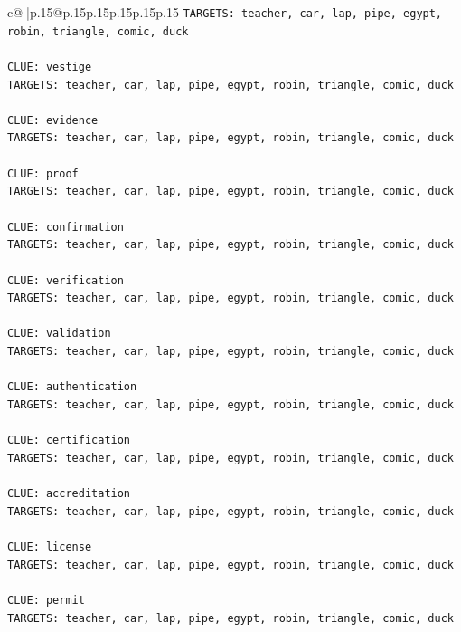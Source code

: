 \documentclass{article}
\begin{document}
{\begin{supertabular}{c@{$\;$}|p{.15\linewidth}@{}p{.15\linewidth}p{.15\linewidth}p{.15\linewidth}p{.15\linewidth}p{.15\linewidth}}
{{{\texttt{TARGETS: teacher, car, lap, pipe, egypt, robin, triangle, comic, duck} \\
\\ 
\texttt{CLUE: vestige} \\
\texttt{TARGETS: teacher, car, lap, pipe, egypt, robin, triangle, comic, duck} \\
\\ 
\texttt{CLUE: evidence} \\
\texttt{TARGETS: teacher, car, lap, pipe, egypt, robin, triangle, comic, duck} \\
\\ 
\texttt{CLUE: proof} \\
\texttt{TARGETS: teacher, car, lap, pipe, egypt, robin, triangle, comic, duck} \\
\\ 
\texttt{CLUE: confirmation} \\
\texttt{TARGETS: teacher, car, lap, pipe, egypt, robin, triangle, comic, duck} \\
\\ 
\texttt{CLUE: verification} \\
\texttt{TARGETS: teacher, car, lap, pipe, egypt, robin, triangle, comic, duck} \\
\\ 
\texttt{CLUE: validation} \\
\texttt{TARGETS: teacher, car, lap, pipe, egypt, robin, triangle, comic, duck} \\
\\ 
\texttt{CLUE: authentication} \\
\texttt{TARGETS: teacher, car, lap, pipe, egypt, robin, triangle, comic, duck} \\
\\ 
\texttt{CLUE: certification} \\
\texttt{TARGETS: teacher, car, lap, pipe, egypt, robin, triangle, comic, duck} \\
\\ 
\texttt{CLUE: accreditation} \\
\texttt{TARGETS: teacher, car, lap, pipe, egypt, robin, triangle, comic, duck} \\
\\ 
\texttt{CLUE: license} \\
\texttt{TARGETS: teacher, car, lap, pipe, egypt, robin, triangle, comic, duck} \\
\\ 
\texttt{CLUE: permit} \\
\texttt{TARGETS: teacher, car, lap, pipe, egypt, robin, triangle, comic, duck} \\
}}}
\end{supertabular}}
\end{document}
